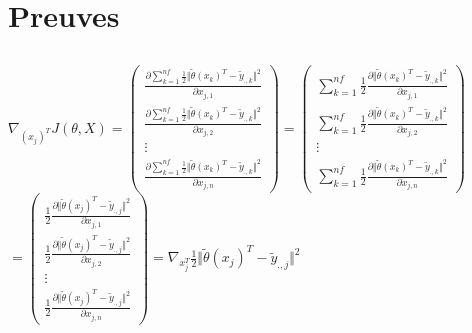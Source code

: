 \documentclass[a4paper,10pt]{article}
\begin{document}
\section{Preuves}
\subsection{}  
\label{P1}  
$\nabla_{(x_{j})^T} J(\theta, X)=  
\begin{pmatrix}  
\displaystyle\frac{\partial \displaystyle\sum_{k=1}^{nf}\frac{1}{2}\Vert\tilde{\theta}(x_{k})^{T}-\tilde{y}_{.,k}\Vert^{2}}{\partial x_{j,1}}\\  
\displaystyle\frac{\partial \displaystyle\sum_{k=1}^{nf}\frac{1}{2}\Vert\tilde{\theta}(x_{k})^{T}-\tilde{y}_{.,k}\Vert^{2}}{\partial x_{j,2}}\\  
\vdots\\  
\displaystyle\frac{\partial \displaystyle\sum_{k=1}^{nf}\frac{1}{2}\Vert\tilde{\theta}(x_{k})^{T}-\tilde{y}_{.,k}\Vert^{2}}{\partial x_{j,n}}  
\end{pmatrix}  
=  
\begin{pmatrix}  
\displaystyle\sum_{k=1}^{nf}  
\frac{1}{2}\frac{\partial\Vert\tilde{\theta}(x_{k})^{T}-\tilde{y}_{.,k}\Vert^{2}}{\partial x_{j,1}}\\  
\displaystyle\sum_{k=1}^{nf}  
\frac{1}{2}\frac{\partial\Vert\tilde{\theta}(x_{k})^{T}-\tilde{y}_{.,k}\Vert^{2}}{\partial x_{j,2}}\\  
\vdots\\  
\displaystyle\sum_{k=1}^{nf}  
\frac{1}{2}\frac{\partial\Vert\tilde{\theta}(x_{k})^{T}-\tilde{y}_{.,k}\Vert^{2}}{\partial x_{j,n}}  
\end{pmatrix}$\\  
$  
=  
\begin{pmatrix}  
\displaystyle  
\frac{1}{2}\frac{\partial\Vert\tilde{\theta}(x_{j})^{T}-\tilde{y}_{.,j}\Vert^{2}}{\partial x_{j,1}}\\  
\displaystyle  
\frac{1}{2}\frac{\partial\Vert\tilde{\theta}(x_{j})^{T}-\tilde{y}_{.,j}\Vert^{2}}{\partial x_{j,2}}\\  
\vdots\\  
\displaystyle  
\frac{1}{2}\frac{\partial\Vert\tilde{\theta}(x_{j})^{T}-\tilde{y}_{.,j}\Vert^{2}}{\partial x_{j,n}}  
\end{pmatrix}  
=  
\displaystyle  
\nabla_{x_{j}^T}\frac{1}{2}\Vert\tilde{\theta}(x_{j})^{T}-\tilde{y}_{.,j}\Vert^{2}  
$  
\end{document}
